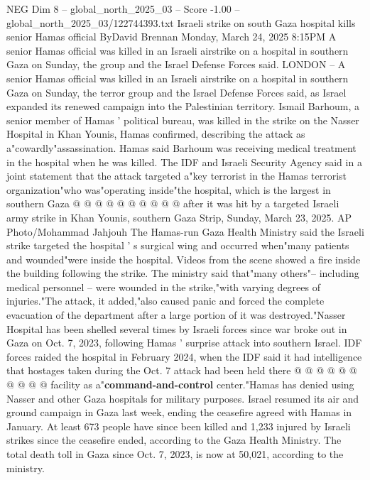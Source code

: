 \begin{textsample}{NEG Dim 8 – global\_north\_2025\_03 – Score -1.00 – global\_north\_2025\_03/122744393.txt}  \label{ex:f8_neg_128}
Israeli strike on south Gaza hospital kills senior Hamas official ByDavid Brennan Monday, March 24, 2025 8:15PM A senior Hamas official was killed in an Israeli airstrike on a hospital in southern Gaza on Sunday, the group and the Israel Defense Forces said.
LONDON -- A senior Hamas official was killed in an Israeli airstrike on a hospital in southern Gaza on Sunday, the terror group and the Israel Defense Forces said, as Israel expanded its renewed campaign into the Palestinian territory.
Ismail Barhoum, a senior member of Hamas ' political bureau, was killed in the strike on the Nasser Hospital in Khan Younis, Hamas confirmed, describing the attack as a"cowardly"assassination.
Hamas said Barhoum was receiving medical treatment in the hospital when he was killed.
The IDF and Israeli Security Agency said in a joint statement that the attack targeted a"key terrorist in the Hamas terrorist organization"who was"operating inside"the hospital, which is the largest in southern Gaza @ @ @ @ @ @ @ @ @ @ after it was hit by a targeted Israeli army strike in Khan Younis, southern Gaza Strip, Sunday, March 23, 2025.
AP Photo/Mohammad Jahjouh The Hamas-run Gaza Health Ministry said the Israeli strike targeted the hospital ' s surgical wing and occurred when"many patients and wounded"were inside the hospital.
Videos from the scene showed a fire inside the building following the strike.
The ministry said that"many others"-- including medical personnel -- were wounded in the strike,"with varying degrees of injuries."The attack, it added,"also caused panic and forced the complete evacuation of the department after a large portion of it was destroyed."Nasser Hospital has been shelled several times by Israeli forces since war broke out in Gaza on Oct. 7, 2023, following Hamas ' surprise attack into southern Israel.
IDF forces raided the hospital in February 2024, when the IDF said it had intelligence that hostages taken during the Oct. 7 attack had been held there @ @ @ @ @ @ @ @ @ @ facility as a"\textbf{command-and-control} center."Hamas has denied using Nasser and other Gaza hospitals for military purposes.
Israel resumed its air and ground campaign in Gaza last week, ending the ceasefire agreed with Hamas in January.
At least 673 people have since been killed and 1,233 injured by Israeli strikes since the ceasefire ended, according to the Gaza Health Ministry.
The total death toll in Gaza since Oct. 7, 2023, is now at 50,021, according to the ministry.

\end{textsample}
